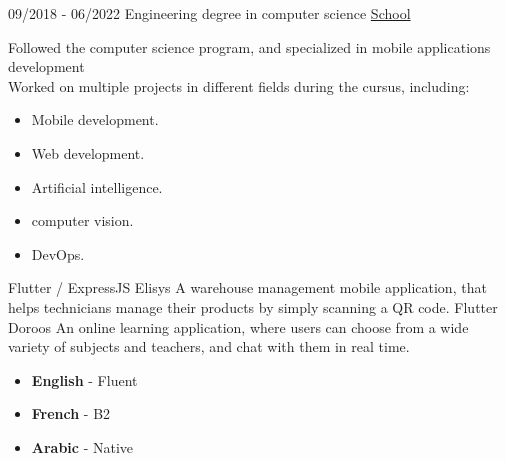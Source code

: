 \documentclass[9pt]{developercv} %
\begin{document}
\vspace{-10 pt}
\begin{entrylist}
	\entry
	{09/2018 - 06/2022}
	{Engineering degree in computer science}
	{\href{https://www.esprit.tn}{School}}
	{Followed the computer science program, and specialized in mobile applications development\\Worked on multiple projects in different fields during the cursus, including:
		\begin{itemize}[noitemsep,topsep=0pt,parsep=0pt,partopsep=0pt, leftmargin=0pt]
			\item Mobile development.
			\item Web development.
			\item Artificial intelligence.
			\item computer vision.
			\item DevOps.
		\end{itemize}
	}
\end{entrylist}

\begin{entrylist}
	\entry
	{Flutter / ExpressJS}
	{Elisys}
	{
	}
	{
		A warehouse management mobile application, that helps technicians manage their products by simply scanning a QR code.
	}
	\entry
	{Flutter}
	{Doroos}
	{
	}
	{
		An online learning application, where users can choose from a wide variety of subjects and teachers, and chat with them in real time.
	}
\end{entrylist}




\vspace{-10 pt}
\vspace{-6pt}

\begin{itemize}[noitemsep,topsep=0pt,parsep=0pt,partopsep=0pt, leftmargin=0.18\textwidth]
	\item \textbf{English} - Fluent
	\item \textbf{French} - B2
	\item \textbf{Arabic} - Native
\end{itemize}


\end{document}
